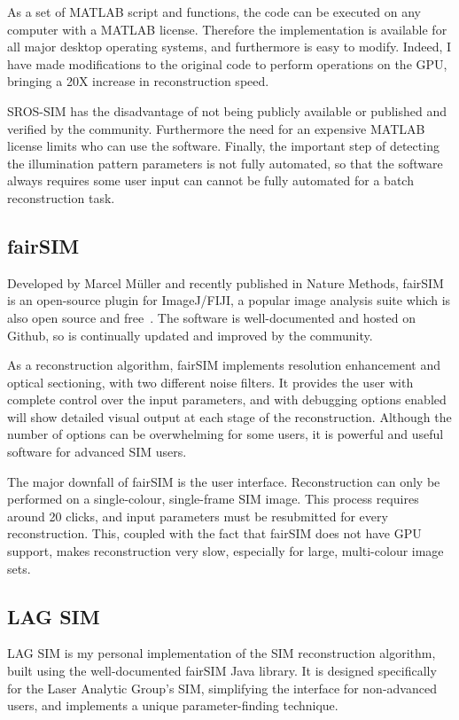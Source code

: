 As a set of MATLAB script and functions, the code can be executed on any computer with a MATLAB license.
Therefore the implementation is available for all major desktop operating systems, and furthermore is easy to modify.
Indeed, I have made modifications to the original code to perform operations on the GPU, bringing a 20X increase in reconstruction speed. 

SROS-SIM has the disadvantage of not being publicly available or published and verified by the community. %
Furthermore the need for an expensive MATLAB license limits who can use the software. 
Finally, the important step of detecting the illumination pattern parameters is not fully automated, so that the software always requires some user input can cannot be fully automated for a batch reconstruction task.

\subsection{fairSIM}
Developed by Marcel M\"uller and recently published in Nature Methods, fairSIM is an open-source plugin for ImageJ/FIJI, a popular image analysis suite which is also open source and free~\cite{muller2016open}. 
The software is well-documented and hosted on Github, so is continually updated and improved by the community. 

As a reconstruction algorithm, fairSIM implements resolution enhancement and optical sectioning, with two different noise filters. 
It provides the user with complete control over the input parameters, and with debugging options enabled will show detailed visual output at each stage of the reconstruction. 
Although the number of options can be overwhelming for some users, it is powerful and useful software for advanced SIM users. 

The major downfall of fairSIM is the user interface. 
Reconstruction can only be performed on a single-colour, single-frame SIM image. 
This process requires around 20 clicks, and input parameters must be resubmitted for every reconstruction. 
This, coupled with the fact that fairSIM does not have GPU support, makes reconstruction very slow, especially for large, multi-colour image sets. 


\subsection{LAG SIM}
LAG SIM is my personal implementation of the SIM reconstruction algorithm, built using the well-documented fairSIM Java library. 
It is designed specifically for the Laser Analytic Group's SIM, simplifying the interface for non-advanced users, and implements a unique parameter-finding technique.

